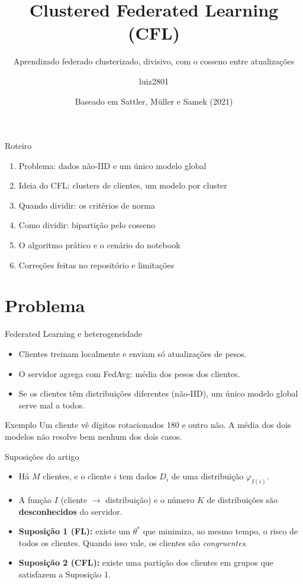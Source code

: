 \documentclass[aspectratio=169]{beamer}
\title{Clustered Federated Learning (CFL)}
\subtitle{Aprendizado federado clusterizado, divisivo, com o cosseno entre atualizações}
\author{luiz2801}
\institute{Repositório \texttt{cfl\_stocfl}}
\date{Baseado em Sattler, Müller e Samek (2021)}
\begin{document}
\begin{frame}
  \titlepage
\end{frame}

\begin{frame}{Roteiro}
  \begin{enumerate}
    \item Problema: dados não-IID e um único modelo global
    \item Ideia do CFL: clusters de clientes, um modelo por cluster
    \item Quando dividir: os critérios de norma
    \item Como dividir: bipartição pelo cosseno
    \item O algoritmo prático e o cenário do notebook
    \item Correções feitas no repositório e limitações
  \end{enumerate}
\end{frame}

\section{Problema}

\begin{frame}{Federated Learning e heterogeneidade}
  \begin{itemize}
    \item Clientes treinam localmente e enviam só atualizações de pesos.
    \item O servidor agrega com FedAvg: média dos pesos dos clientes.
    \item Se os clientes têm distribuições diferentes (não-IID), um único
      modelo global serve mal a todos.
  \end{itemize}

  \vspace{0.6em}
  \begin{block}{Exemplo}
    Um cliente vê dígitos rotacionados 180\textdegree{} e outro não. A média
    dos dois modelos não resolve bem nenhum dos dois casos.
  \end{block}
\end{frame}

\begin{frame}{Suposições do artigo}
  \begin{itemize}
    \item Há $M$ clientes, e o cliente $i$ tem dados $D_i$ de uma distribuição $\varphi_{I(i)}$.
    \item A função $I$ (cliente $\rightarrow$ distribuição) e o número $K$ de distribuições são
      \textbf{desconhecidos} do servidor.
    \item \textbf{Suposição 1 (FL):} existe um $\theta^*$ que minimiza, ao mesmo tempo, o risco
      de todos os clientes. Quando isso vale, os clientes são \emph{congruentes}.
    \item \textbf{Suposição 2 (CFL):} existe uma partição dos clientes em grupos que satisfazem a
      Suposição 1.
  \end{itemize}
\end{frame}
\end{document}
